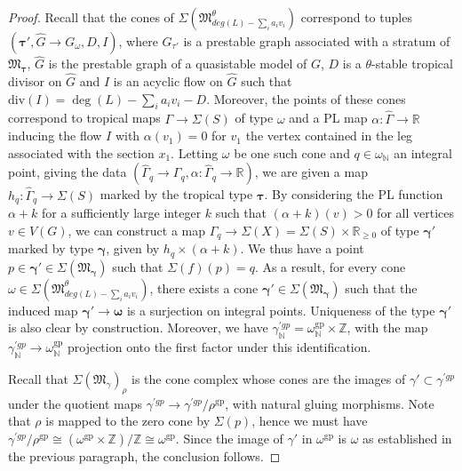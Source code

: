 \documentclass[12pt, oneside]{amsart}   	%
\newcommand{\NN}{\mathbb{N}}
\newcommand{\ZZ}{\mathbb{Z}}
\newcommand{\gp}{\operatorname{gp}}
\numberwithin{equation}{section}
\numberwithin{thm}{section}
\numberwithin{figure}{section}
\begin{document}
\begin{proof}
Recall that the cones of $\Sigma(\mathfrak{M}^\theta_{deg(L) - \sum_i a_iv_i})$ correspond to tuples $(\pmb\tau',\widehat{G} \rightarrow G_{\omega},D, I)$, where $G_{\tau'}$ is a prestable graph associated with a stratum of $\mathfrak{M}_{\pmb\tau}$, $\widehat{G}$ is the prestable graph of a quasistable model of $G$, $D$ is a $\theta$-stable tropical divisor on $\widehat{G}$ and $I$ is an acyclic flow on $\widehat{G}$ such that $\text{div}(I) = \deg(L) - \sum_i a_iv_i - D$. Moreover, the points of these cones correspond to tropical maps $\Gamma \rightarrow \Sigma(S)$ of type $\omega$ and a PL map $\alpha: \hat{\Gamma} \rightarrow \mathbb{R}$ inducing the flow $I$ with $\alpha(v_1) = 0$ for $v_1$ the vertex contained in the leg associated with the section $x_1$. Letting $\omega$ be one such cone and $q \in \omega_{\NN}$ an integral point, giving the data $(\hat{\Gamma}_q\rightarrow \Gamma_q, \alpha:\hat{\Gamma}_q \rightarrow \mathbb{R})$, we are given a map $h_q: \hat{\Gamma}_q \rightarrow \Sigma(S)$ marked by the tropical type $\pmb\tau$. By considering the PL function $\alpha + k$ for a sufficiently large integer $k$ such that $(\alpha+k)(v) > 0$ for all vertices $v \in V(G)$, we can construct a map $\hat{\Gamma}_q \rightarrow \Sigma(X) = \Sigma(S) \times \mathbb{R}_{\ge 0}$ of type $\pmb\gamma'$ marked by type $\pmb\gamma$, given by $h_q \times (\alpha + k)$. We thus have a point $p \in \pmb\gamma' \in \Sigma(\mathfrak{M}_{\pmb\gamma})$ such that $\Sigma(f)(p) = q$. As a result, for every cone $\omega \in \Sigma(\mathfrak{M}^\theta_{deg(L) - \sum_i a_iv_i})$, there exists a cone $\pmb\gamma' \in \Sigma(\mathfrak{M}_{\pmb\gamma})$ such that the induced map $\pmb\gamma' \rightarrow \pmb\omega$ is a surjection on integral points. Uniqueness of the type $\pmb\gamma'$ is also clear by construction. Moreover, we have $\gamma^{'gp}_{\NN} = \omega^{\gp}_{\NN}\times \ZZ$, with the map $\gamma^{'gp}_{\NN} \rightarrow \omega^{\gp}_{\NN}$ projection onto the first factor under this identification. 

Recall that $\Sigma(\mathfrak{M}_{\gamma})_{\rho}$ is the cone complex whose cones are the images of $\gamma' \subset \gamma^{'gp}$ under the quotient maps $\gamma^{'gp} \rightarrow \gamma^{'gp}/\rho^{\gp}$, with natural gluing morphisms. Note that $\rho$ is mapped to the zero cone by $\Sigma(p)$, hence we must have $\gamma^{'gp}/\rho^{\gp} \cong (\omega^{\gp}\times\ZZ)/\ZZ \cong \omega^{\gp}$. Since the image of $\gamma'$ in $\omega^{\gp}$ is $\omega$ as established in the previous paragraph, the conclusion follows.
\end{proof}
\end{document}
